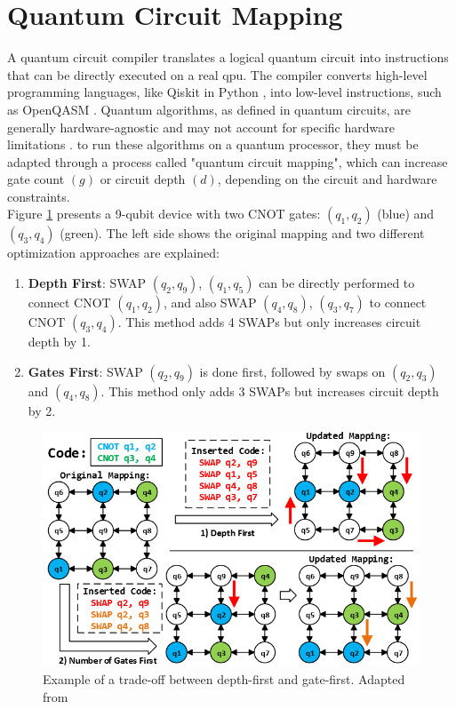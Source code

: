 \section{Quantum Circuit Mapping} %
A quantum circuit compiler translates a logical quantum circuit into instructions that can be directly executed on a real \acrshort{qpu}. The compiler converts high-level programming languages, like Qiskit in Python \cite{aleksandrowicz_qiskit_2019}, into low-level instructions, such as OpenQASM \cite{cross_open_2017}. Quantum algorithms, as defined in quantum circuits, are generally hardware-agnostic and may not account for specific hardware limitations \cite{ash-saki_qure_2019}. to run these algorithms on a quantum processor, they must be adapted through a process called "quantum circuit mapping", which can increase gate count $(g)$ or circuit depth $(d)$, depending on the circuit and hardware constraints. \\
Figure \ref{fig:tackling-depth-gate-first} presents a 9-qubit device with two CNOT gates: $(q_1, q_2)$ (blue) and $(q_3, q_4)$ (green). The left side shows the original mapping and two different optimization approaches are explained:
\begin{enumerate}[nolistsep]
    \item \textbf{Depth First}: SWAP $(q_2, q_9)$, $(q_1, q_5)$ can be directly performed to connect CNOT $(q_1, q_2)$, and also SWAP $(q_4, q_8)$, $(q_3, q_7)$ to connect CNOT $(q_3, q_4)$. This method adds 4 SWAPs but only increases circuit depth by 1.
    \item \textbf{Gates First}: SWAP $(q_2, q_9)$ is done first, followed by swaps on $(q_2, q_3)$ and $(q_4, q_8)$. This method only adds 3 SWAPs but increases circuit depth by 2.
\end{enumerate} 
\begin{figure}[htb]
    \centering
    \includegraphics[width=0.6\linewidth]{image/tackling_depth_gate_first.png}
    \caption{Example of a trade-off between depth-first and gate-first. Adapted from \cite{li_tackling_2019}}
    \label{fig:tackling-depth-gate-first}
\end{figure}

